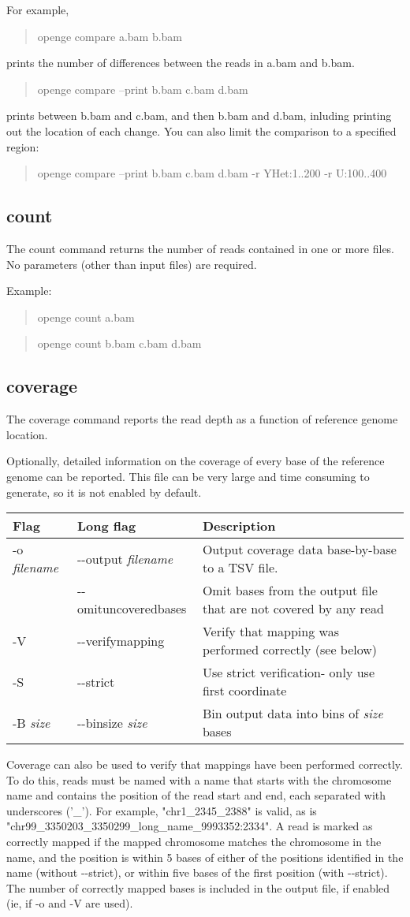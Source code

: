 \documentclass[11pt]{article}
\newcommand {\cmd}[1] {\begin{quote}#1\end{quote}}
\begin{document}
For example,
\cmd{openge compare a.bam b.bam}
prints the number of differences between the reads in a.bam and b.bam.
\cmd{openge compare --print b.bam c.bam d.bam}
prints between b.bam and c.bam, and then b.bam and d.bam, inluding printing out the location of each change. You can also limit the comparison to a specified region:
\cmd{openge compare --print b.bam c.bam d.bam -r YHet:1..200 -r U:100..400}

\subsection {count}
The count command returns the number of reads contained in one or more files. No parameters (other than input files) are required.

Example:
\cmd{openge count a.bam}
\cmd{openge count b.bam c.bam d.bam}

\subsection {coverage}
The coverage command reports the read depth as a function of reference genome location. 

Optionally, detailed information on the coverage of every base of the reference genome can be reported. This file can be very large and time consuming to generate, so it is not enabled by default. 

\begin{center}
\begin{tabular}{llp{3.5in}}
\hline
Flag&Long flag&Description\\ \hline
-o  \textit{filename}&{-}{-}output \textit{filename}&Output coverage data base-by-base to a TSV file.\\
&{-}{-}omituncoveredbases&Omit bases from the output file that are not covered by any read\\
-V&{-}{-}verifymapping&Verify that mapping was performed correctly (see below)\\
-S&{-}{-}strict&Use strict verification- only use first coordinate\\
-B \textit{size}&{-}{-}binsize \textit{size}&Bin output data into bins of \textit{size} bases\\
\end{tabular}
\end{center}

Coverage can also be used to verify that mappings have been performed correctly. To do this, reads must be named with a name that starts with the chromosome name and contains the position of the read start and end, each separated with underscores ('\_'). For example, "chr1\_2345\_2388" is valid, as is "chr99\_3350203\_3350299\_long\_name\_9993352:2334". A read is marked as correctly mapped if the mapped chromosome matches the chromosome in the name, and the position is within 5 bases of either of the positions identified in the name (without {-}{-}strict), or within five bases of the first position (with {-}{-}strict). The number of correctly mapped bases is included in the output file, if enabled (ie, if -o and -V are used).
\end{document}
